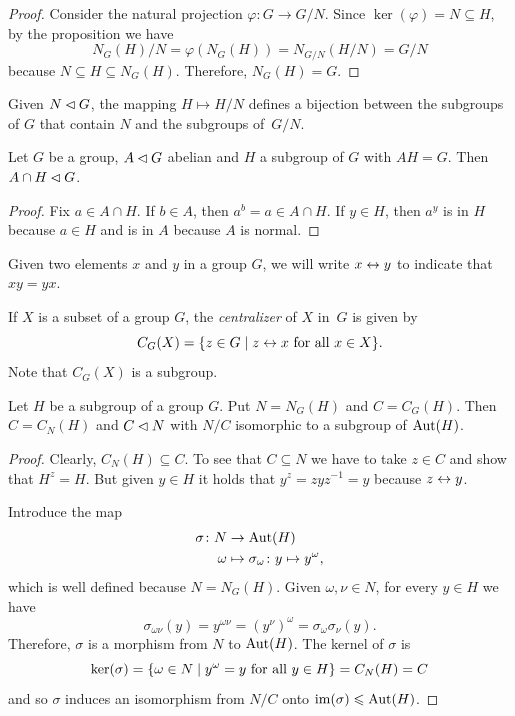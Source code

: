 \begin{proof} Consider the natural projection $\varphi\colon G\to G/N$. Since $\ker(\varphi)=N\subseteq H$, by the proposition we have
$$
    N_G(H)/N=\varphi(N_G(H))=N_{G/N}(H/N)=G/N
$$
because $N\subseteq H\subseteq N_G(H)$. Therefore, $N_G(H)=G$.  \end{proof}

\begin{rem}\label{biunivocal-normal-quotient}
    Given\/ $N\lhd G$, the mapping\/ $H\mapsto H/N$ defines a bijection between the subgroups of\/ $G$ that contain\/ $N$ and the subgroups of\/~$G/N$.
\end{rem}

\begin{prop}\label{intersect-abelian-normal-get-normal}
    Let\/ $G$ be a group, $A\lhd G$ abelian and\/ $H$ a subgroup of $G$ with $AH=G$. Then\/ $A\cap H\lhd G$.
\end{prop}

\begin{proof} Fix $a\in A\cap H$. If $b\in A$, then $a^b=a\in A\cap H$. If $y\in H$, then $a^y$ is in $H$ because $a\in H$ and is in $A$ because $A$ is normal.  \end{proof}

\begin{ntn}
    Given two elements $x$ and $y$ in a group $G$, we will write $x\mathrel\leftrightarrow y$ to indicate that\/ $xy=yx$.
\end{ntn}

\begin{defn}
    If $X$ is a subset of a group $G$, the \textsl{centralizer} of\/ $X$ in\/~$G$ is given by
    $$
        C_G(X) = \{z\in G\mid z\mathrel\leftrightarrow x \textrm{\upshape\ for all }x\in X\}.
    $$
    Note that $C_G(X)$ is a subgroup.
\end{defn}

\begin{cor}
    Let $H$ be a subgroup of a group $G$. Put $N = N_G(H)$ and\/ $C = C_G(H)$. Then\/ $C=C_N(H)$ and\/ $C \lhd N$ with $N/C$ isomorphic to a subgroup of ${\rm Aut}(H)$.
\end{cor}

\begin{proof}

Clearly, $C_N(H)\subseteq C$. To see that $C\subseteq N$ we have to take $z\in C$ and show that $H^z=H$. But given $y\in H$ it holds that $y^z=zyz^{-1}=y$ because $z\mathrel\leftrightarrow y$.

Introduce the map
\begin{align*}
    \sigma\colon N&\to{\rm Aut}(H)\\
    \omega&\mapsto\sigma_\omega\colon y\mapsto y^\omega,
\end{align*}
which is well defined because $N=N_G(H)$. Given $\omega,\nu\in N$, for every $y\in H$ we have
$$
    \sigma_{\omega\nu}(y)
        =y^{\omega\nu}=(y^\nu)^\omega = \sigma_\omega\sigma_\nu(y).
$$
Therefore, $\sigma$ is a morphism from $N$ to ${\rm Aut}(H)$. The kernel of $\sigma$ is
$$
    \ker(\sigma) = \{\omega\in N\mid y^\omega = y\textrm{\upshape\ for all }y\in H\}
        = C_N(H) = C
$$
and so $\sigma$ induces an isomorphism from $N/C$ onto $\operatorname{im}(\sigma)\leqslant{\rm Aut}(H)$.  \end{proof}


